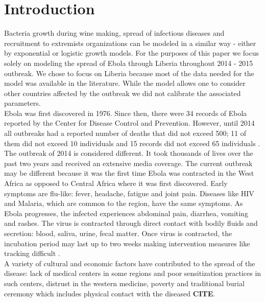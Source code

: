 \documentclass[10pt]{article}
\begin{document}
\section{Introduction}
Bacteria growth during wine making, spread of infectious diseases and recruitment to extremists organizations can be modeled in a similar way - either by exponential or logistic growth models. For the purposes of this paper we focus solely on modeling the spread of Ebola through Liberia throughout 2014 - 2015 outbreak. We chose to focus on Liberia because most of the data needed for the model was available in the literature. While the model allows one to consider other countries affected by the outbreak we did not calibrate the associated parameters. \\
%
%
%
Ebola was first discovered in 1976. Since then, there were 34 records of Ebola reported by the Center for Disease Control and Prevention. However, until 2014 all outbreaks had a reported number of deaths that did not exceed 500; 11 of them did not exceed 10 individuals and 15 records did not exceed 65 individuals \cite{CDCOutbreaks}.  The outbreak of 2014 is considered different. It took thousands of lives over the past two years and received an extensive media coverage.
%
%
%
The current outbreak may be different because it was the first time Ebola was contracted in the West Africa as opposed to Central Africa where it was first discovered. Early symptoms are flu-like: fever, headache, fatigue and joint pain. Diseases like HIV and Malaria, which are common to the region, have the same symptoms. As Ebola progresses, the infected experiences abdominal pain, diarrhea, vomiting and rashes. The virus is contracted through direct contact with bodily fluids and secretion: blood, saliva, urine, fecal matter. Once virus is contracted, the incubation period may last up to two weeks making intervention measures like tracking difficult \cite{CDCSympt}. 
%
%
%
\\A variety of cultural and economic factors have contributed to the spread of the disease: lack of medical centers in some regions and poor sensitization practices in such centers, distrust in the western medicine, poverty and traditional burial ceremony which includes physical contact with the diseased \textbf{CITE}. \\
%
%
%
\end{document}
